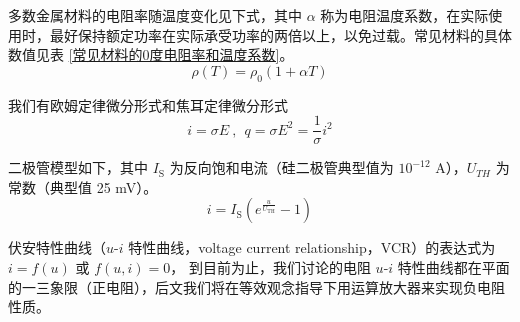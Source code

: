 \documentclass[UTF8]{report}
\theoremstyle{MyLineTheoremStyle} %
\theoremstyle{MyBlockTheoremStyle} %
\theoremstyle{MySubsubsectionStyle} %
\begin{document}
多数金属材料的电阻率随温度变化见下式，其中 $\alpha$ 称为电阻温度系数，在实际使用时，最好保持额定功率在实际承受功率的两倍以上，以免过载。常见材料的具体数值见表 \ref{常见材料的0度电阻率和温度系数}。
\begin{equation}
\rho(T) = \rho_0(1+\alpha T)
\end{equation}
\begin{table}[H]\centering\small
    \setlength{\tabcolsep}{2mm} %
    \caption{常见材料的 0 \textdegree C 电阻率和温度系数}
    \label{常见材料的0度电阻率和温度系数}
\end{table}


我们有欧姆定律微分形式和焦耳定律微分形式
\begin{equation}
i = \sigma E\ ,\ \ q =  \sigma E^2 = \frac{1}{\sigma} i^2  
\end{equation}

二极管模型如下，其中 $I_{\mathrm{S}}$ 为反向饱和电流（硅二极管典型值为 $10^{-12}$ A），$U_{TH}$ 为常数（典型值 25 mV）。
\begin{equation}
i = I_{\mathrm{S}}\left(e^{\frac{u}{U_{\mathrm{TH}}}} - 1\right)
\end{equation}

伏安特性曲线（$u$-$i$ 特性曲线，voltage current relationship，VCR）的表达式为 $i = f(u)$ 或 $f(u,i) = 0$，
到目前为止，我们讨论的电阻 $u$-$i$ 特性曲线都在平面的一三象限（正电阻），后文我们将在等效观念指导下用运算放大器来实现负电阻性质。
\end{document}
